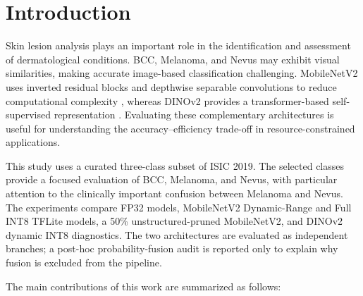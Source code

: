 \documentclass[3p,times,procedia]{elsarticle}
\begin{document}

\vspace*{-6pt}

\section{Introduction}
\label{sec:introduction}

Skin lesion analysis plays an important role in the identification and assessment of dermatological conditions. BCC, Melanoma, and Nevus may exhibit visual similarities, making accurate image-based classification challenging. MobileNetV2 uses inverted residual blocks and depthwise separable convolutions to reduce computational complexity \cite{sandler2018}, whereas DINOv2 provides a transformer-based self-supervised representation \cite{oquab2024}. Evaluating these complementary architectures is useful for understanding the accuracy--efficiency trade-off in resource-constrained applications.

This study uses a curated three-class subset of ISIC 2019. The selected classes provide a focused evaluation of BCC, Melanoma, and Nevus, with particular attention to the clinically important confusion between Melanoma and Nevus. The experiments compare FP32 models, MobileNetV2 Dynamic-Range and Full INT8 TFLite models, a 50\% unstructured-pruned MobileNetV2, and DINOv2 dynamic INT8 diagnostics. The two architectures are evaluated as independent branches; a post-hoc probability-fusion audit is reported only to explain why fusion is excluded from the pipeline.

The main contributions of this work are summarized as follows:
\end{document}
